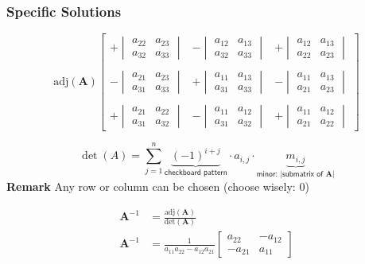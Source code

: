 \subsubsection{Specific Solutions}
\noindent\begin{equation*}
    \mathrm{adj}(\mathbf{A})\begin{bmatrix}
        +\begin{vmatrix}a_{22}&a_{23}\\a_{32}&a_{33}\end{vmatrix} & -\begin{vmatrix}a_{12}&a_{13}\\a_{32}&a_{33}\end{vmatrix} & +\begin{vmatrix}a_{12}&a_{13}\\a_{22}&a_{23}\end{vmatrix} \\\\
        -\begin{vmatrix}a_{21}&a_{23}\\a_{31}&a_{33}\end{vmatrix} & +\begin{vmatrix}a_{11}&a_{13}\\a_{31}&a_{33}\end{vmatrix} & -\begin{vmatrix}a_{11}&a_{13}\\a_{21}&a_{23}\end{vmatrix} \\\\
        +\begin{vmatrix}a_{21}&a_{22}\\a_{31}&a_{32}\end{vmatrix} & -\begin{vmatrix}a_{11}&a_{12}\\a_{31}&a_{32}\end{vmatrix} & +\begin{vmatrix}a_{11}&a_{12}\\a_{21}&a_{22}\end{vmatrix}
    \end{bmatrix}
\end{equation*}

\noindent\begin{equation*}
    \det(A)=\sum_{j=1}^n \underbrace{{(-1)}^{i+j}}_{\textsf{checkboard pattern}}\cdot a_{i,j}\cdot\underbrace{m_{i,j}}_{\textsf{minor: |submatrix of }\mathbf{A}|}
\end{equation*}
\textbf{Remark} Any row or column can be chosen (choose wisely: 0)

\newpar{}

\begin{align*}
    \mathbf{A}^{-1} & = \frac{\text{adj}(\mathbf{A})}{\text{det}(\mathbf{A})} \\
    \mathbf{A}^{-1} & = \frac{1}{a_{11}a_{22} - a_{12}a_{21}}
    \begin{bmatrix}
        a_{22}  & - a_{12} \\
        -a_{21} & a_{11}
    \end{bmatrix}
\end{align*}